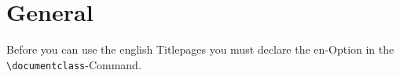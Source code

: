 \documentclass[ trackchanges, hyperref, pdf, mp, mppdf, en]{wise}
\newcommand\code[1]{\texttt{#1}}
\newcommand\command[1]{\code{\textbackslash{}#1}}
\begin{document}

\begin{preface}
  \tableofcontents
\end{preface}



\section{General}

Before you can use the english Titlepages you must declare the  en-Option in the \command{documentclass}-Command. 
\end{document}
